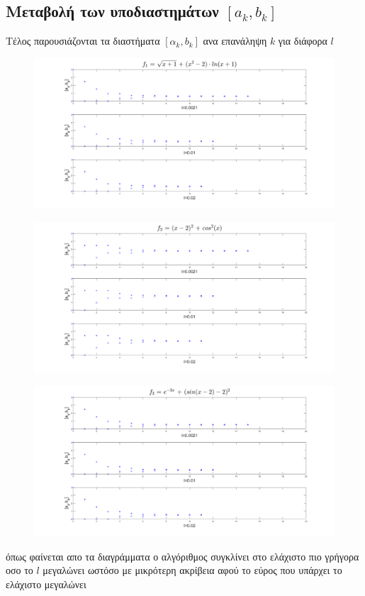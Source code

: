 \documentclass{article}
\begin{document}
  \subsection*{Μεταβολή των υποδιαστημάτων $[a_k,b_k]$}
Tέλος παρουσιάζονται τα διαστήματα $[α_k,b_k]$ ανα επανάληψη $k$ για διάφορα $l$  
\begin{figure}[h!]	
     \centering
     \advance\leftskip-2.45cm 
  \includegraphics[width=160mm,scale=2]{thema3b1.png}
\end{figure}
\begin{figure}[h!]	
     \centering
     \advance\leftskip-2.45cm 
  \includegraphics[width=160mm,scale=2]{thema3b2.png}
\end{figure} \clearpage
\begin{figure}[h!]	
     \centering
     \advance\leftskip-2.45cm 
  \includegraphics[width=170mm,scale=2]{thema3b3.png}
\end{figure}
 όπως φαίνεται απο τα διαγράμματα ο αλγόριθμος συγκλίνει στο ελάχιστο πιο γρήγορα οσο το $l$ μεγαλώνει ωστόσο με μικρότερη ακρίβεια αφού το εύρος που υπάρχει το ελάχιστο μεγαλώνει 
 \newpage
\end{document}
